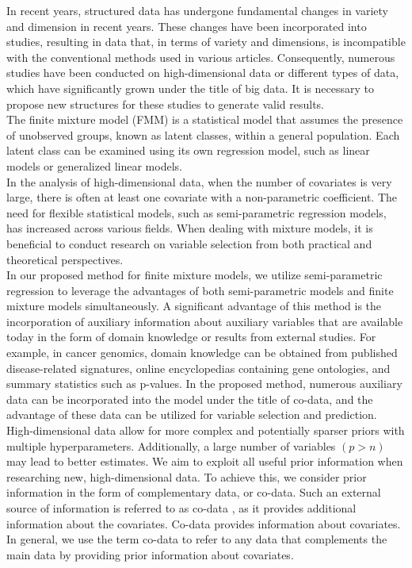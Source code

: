 In recent years, structured data has undergone fundamental changes in variety and dimension in recent years. These changes have been incorporated into studies, resulting in data that, in terms of variety and dimensions, is incompatible with the conventional methods used in various articles. Consequently, numerous studies have been conducted on high-dimensional data or different types of data, which have significantly grown under the title of big data. It is necessary to propose new structures for these studies to generate valid results.\\
The finite mixture model (FMM) is a statistical model that assumes the presence of unobserved groups, known as latent classes, within a general population. Each latent class can be examined using its own regression model, such as linear models or generalized linear models. \\
In the analysis of high-dimensional data, when the number of covariates is very large, there is often at least one covariate with a non-parametric coefficient. The need for flexible statistical models, such as semi-parametric regression models, has increased across various fields. When dealing with mixture models, it is beneficial to conduct research on variable selection from both practical and theoretical perspectives.\\
In our proposed method for finite mixture models, we utilize semi-parametric regression to leverage the advantages of both semi-parametric models and finite mixture models simultaneously. A significant advantage of this method is the incorporation of auxiliary information about auxiliary variables that are available today in the form of domain knowledge or results from external studies. For example, in cancer genomics, domain knowledge can be obtained from published disease-related signatures, online encyclopedias containing gene ontologies, and summary statistics such as p-values. In the proposed method, numerous auxiliary data can be incorporated into the model under the title of co-data, and the advantage of these data can be utilized for variable selection and prediction.\\
High-dimensional data allow for more complex and potentially sparser priors with multiple hyperparameters. Additionally, a large number of variables $ (p>n) $ may lead to better estimates. We aim to exploit all useful prior information when researching new, high-dimensional data. To achieve this, we consider prior information in the form of complementary data, or co-data. Such an external source of information is referred to as co-data \hbox{\cite{Neuenschwander2016}}, as it provides additional information about the covariates. Co-data provides information about covariates. In general, we use the term co-data to refer to any data that complements the main data by providing prior information about covariates.\\
